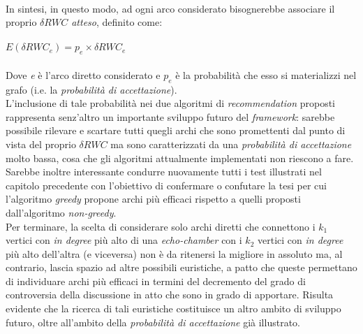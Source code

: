 \\In sintesi, in questo modo, ad ogni arco considerato bisognerebbe associare il proprio \textit{$\delta RWC$ atteso}, definito come:
\\\\
$E(\delta RWC_e) = p_e \times \delta RWC_e$
\\\\
Dove \textit{e} è l'arco diretto considerato e \textit{$p_e$} è la probabilità che esso si materializzi nel grafo (i.e. la \textit{probabilità di accettazione}). 
\\L'inclusione di tale probabilità nei due algoritmi di \textit{recommendation} proposti rappresenta senz'altro un importante sviluppo futuro del \textit{framework}: sarebbe possibile rilevare e scartare tutti quegli archi che sono promettenti dal punto di vista del proprio \textit{$\delta RWC$} ma sono caratterizzati da una \textit{probabilità di accettazione} molto bassa, cosa che gli algoritmi attualmente implementati non riescono a fare. 
Sarebbe inoltre interessante condurre nuovamente tutti i test illustrati nel capitolo precedente con l'obiettivo di confermare o confutare la tesi per cui l'algoritmo \textit{greedy} propone archi più efficaci rispetto a quelli proposti dall'algoritmo \textit{non-greedy}.
\\Per terminare, la scelta di considerare solo archi diretti che connettono i \textit{$k_1$} vertici con \textit{in degree} più alto di una \textit{echo-chamber} con i \textit{$k_2$} vertici con \textit{in degree} più alto dell'altra (e viceversa) non è da ritenersi la migliore in assoluto ma, al contrario, lascia spazio ad altre possibili euristiche, a patto che queste permettano di individuare archi più efficaci in termini del decremento del grado di controversia della discussione in atto che sono in grado di apportare. Risulta evidente che la ricerca di tali euristiche costituisce un altro ambito di sviluppo futuro, oltre all'ambito della \textit{probabilità di accettazione} già illustrato.
